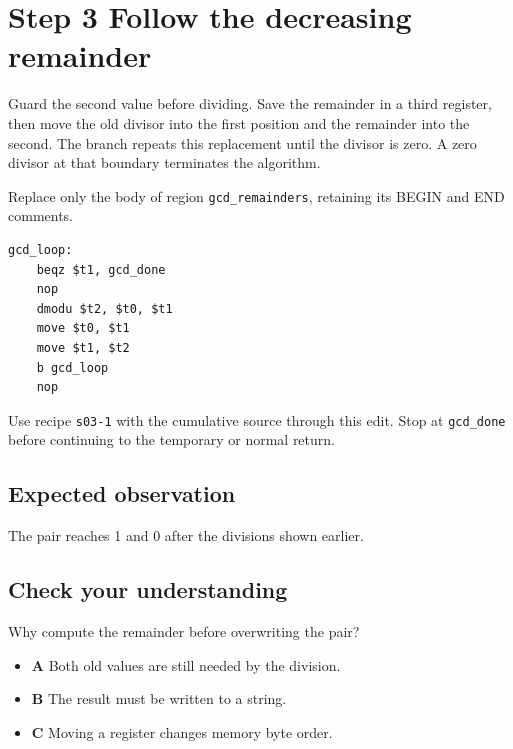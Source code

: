 \section{Step 3 Follow the decreasing remainder}\label{rsa-s03}

Guard the second value before dividing. Save the remainder in a third register, then move the old divisor into the first position and the remainder into the second. The branch repeats this replacement until the divisor is zero. A zero divisor at that boundary terminates the algorithm.

Replace only the body of region \texttt{gcd\_remainders}, retaining its BEGIN and END comments.

\begin{verbatim}
gcd_loop:
    beqz $t1, gcd_done
    nop
    dmodu $t2, $t0, $t1
    move $t0, $t1
    move $t1, $t2
    b gcd_loop
    nop
\end{verbatim}

Use recipe \texttt{s03-1} with the cumulative source through this edit. Stop at \texttt{gcd\_done} before continuing to the temporary or normal return.

\subsection{Expected observation}
The pair reaches 1 and 0 after the divisions shown earlier.

\subsection{Check your understanding}
Why compute the remainder before overwriting the pair?

\begin{itemize}
  \item \textbf{A} Both old values are still needed by the division.
  \item \textbf{B} The result must be written to a string.
  \item \textbf{C} Moving a register changes memory byte order.
\end{itemize}
